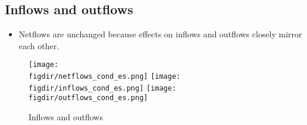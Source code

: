\subsection{Inflows and outflows}%
\label{sub:inflows_and_outflows}

\begin{itemize}
    \item Netflows are unchanged because effects on inflows and outflows closely mirror
        each other.
\end{itemize}

\begin{figure}[H]
    \centering
    \caption{Inflows and outflows}%
    \label{fig:in_out_results}
    \texttt{[image: \\figdir/netflows\_cond\_es.png]}
    \texttt{[image: \\figdir/inflows\_cond\_es.png]}
    \texttt{[image: \\figdir/outflows\_cond\_es.png]}
\end{figure}




